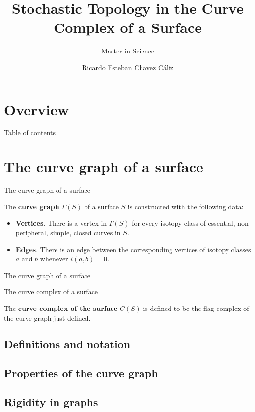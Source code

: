 \documentclass[UKenglish, aspectratio = 169]{beamer}
\author[R. Chávez-Cáliz \& N. Bárcenas-Torres]
{Ricardo Esteban Chavez Cáliz \texorpdfstring{\\}{} }
\title{Stochastic Topology in the Curve Complex of a Surface}
\subtitle{Master in Science}
\begin{document}
\section{Overview}
\begin{frame}{Table of contents}
    \tableofcontents
\end{frame}

\section{The curve graph of a surface}
\SectionPage

\hidelogo
\begin{frame}{The curve graph of a surface}
\begin{definition}
The \textbf{curve graph} $\Gamma(S)$ of a surface $S$ is constructed with the following data:
\begin{itemize}
\item \textbf{Vertices}. There is a vertex in $\Gamma(S)$ for every isotopy class of essential, non-peripheral, simple, closed curves in $S$.
\item \textbf{Edges}. There is an edge between the corresponding vertices of isotopy classes $a$ and $b$ whenever $i(a,b)=0$.
\end{itemize}
\end{definition}
\end{frame}
\begin{frame}{The curve graph of a surface}

\end{frame}

\begin{frame}{The curve complex of a surface}
\begin{definition}
The \textbf{curve complex of the surface} $C(S)$ is defined to be the flag complex of the curve graph just defined.
\end{definition}
\end{frame}

\subsection{Definitions and notation}

\subsection{Properties of the curve graph}
\subsection{Rigidity in graphs}
\end{document}
